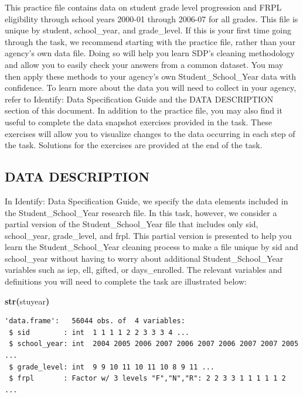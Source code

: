 \documentclass[12pt]{article}
\makeatletter
\newcommand{\hlfunctioncall}[1]{\textcolor[rgb]{0.501960784313725,0,0.329411764705882}{\textbf{#1}}}%
\newcommand{\hlkeyword}[1]{\textcolor[rgb]{0,0,0}{\textbf{#1}}}%
\newcommand{\hlsymbol}[1]{\textcolor[rgb]{0,0,0}{#1}}%
\newenvironment{kframe}{%
 \def\FrameCommand##1{\hskip\@totalleftmargin \hskip-\fboxsep
 \colorbox{shadecolor}{##1}\hskip-\fboxsep
     \hskip-\linewidth \hskip-\@totalleftmargin \hskip\columnwidth}%
 \MakeFramed {\advance\hsize-\width
   \@totalleftmargin\z@ \linewidth\hsize
   \@setminipage}}%
 {\par\unskip\endMakeFramed}
\newenvironment{knitrout}{}{} %
\renewenvironment{knitrout}{\begin{footnotesize}}{\end{footnotesize}}
\makeatother
\begin{document}
This practice file contains data on student grade level progression and FRPL eligibility through school years 2000-01 through 2006-07 for all 
grades. This file is unique by student, school\_year, and grade\_level.
If this is your first time going through the task, we recommend starting with the practice file, rather than your agency's own 
data file.  Doing so will help you learn SDP's cleaning methodology and allow you to easily check your answers from a common 
dataset.  You may then apply these methods to your agency’s own Student\_School\_Year data with confidence.  To learn more 
about the data you will need to collect in your agency, refer to Identify: Data Specification Guide and the DATA DESCRIPTION
section of this document.
In addition to the practice file, you may also find it useful to complete the data snapshot exercises provided in the task.  These 
exercises will allow you to visualize changes to the data occurring in each step of the task.  Solutions for the exercises are 
provided at the end of the task.

\subsection{DATA DESCRIPTION}
In Identify: Data Specification Guide, we specify the data elements included in the Student\_School\_Year research file.  In this 
task, however, we consider a partial version of the Student\_School\_Year file that includes only sid, school\_year, grade\_level, 
and frpl. This partial version is presented to help you learn the Student\_School\_Year cleaning process to make a file unique by 
sid and school\_year without having to worry about additional Student\_School\_Year variables such as iep, ell, gifted, or days\_enrolled.  
The relevant variables and definitions you will need to complete the task are illustrated below:  

\begin{knitrout}
\color{fgcolor}\begin{kframe}
\begin{flushleft}
\ttfamily\noindent
\hlfunctioncall{str}\hlkeyword{(}\hlsymbol{stuyear}\hlkeyword{)}\mbox{}
\normalfont
\end{flushleft}
\begin{verbatim}
'data.frame':	56044 obs. of  4 variables:
 $ sid        : int  1 1 1 1 2 2 3 3 3 4 ...
 $ school_year: int  2004 2005 2006 2007 2006 2007 2006 2007 2007 2005 ...
 $ grade_level: int  9 9 10 11 10 11 10 8 9 11 ...
 $ frpl       : Factor w/ 3 levels "F","N","R": 2 2 3 3 1 1 1 1 1 2 ...
\end{verbatim}
\end{kframe}
\end{knitrout}
\end{document}
